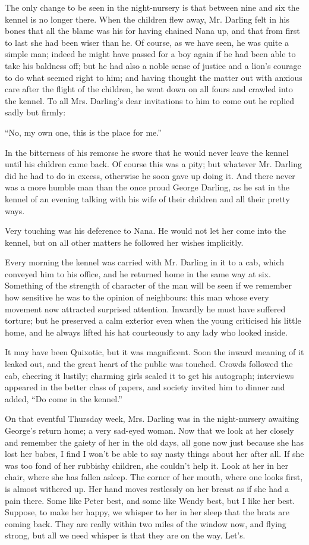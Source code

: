 The only change to be seen in the night-nursery is that between nine
and six the kennel is no longer there. When the children flew away, Mr.
Darling felt in his bones that all the blame was his for having chained
Nana up, and that from first to last she had been wiser than he. Of
course, as we have seen, he was quite a simple man; indeed he might
have passed for a boy again if he had been able to take his baldness
off; but he had also a noble sense of justice and a lion's courage to
do what seemed right to him; and having thought the matter out with
anxious care after the flight of the children, he went down on all
fours and crawled into the kennel. To all Mrs. Darling's dear
invitations to him to come out he replied sadly but firmly:

``No, my own one, this is the place for me.''

In the bitterness of his remorse he swore that he would never leave the
kennel until his children came back. Of course this was a pity; but
whatever Mr. Darling did he had to do in excess, otherwise he soon gave
up doing it. And there never was a more humble man than the once proud
George Darling, as he sat in the kennel of an evening talking with his
wife of their children and all their pretty ways.

Very touching was his deference to Nana. He would not let her come into
the kennel, but on all other matters he followed her wishes implicitly.

Every morning the kennel was carried with Mr. Darling in it to a cab,
which conveyed him to his office, and he returned home in the same way
at six. Something of the strength of character of the man will be seen
if we remember how sensitive he was to the opinion of neighbours: this
man whose every movement now attracted surprised attention. Inwardly he
must have suffered torture; but he preserved a calm exterior even when
the young criticised his little home, and he always lifted his hat
courteously to any lady who looked inside.

It may have been Quixotic, but it was magnificent. Soon the inward
meaning of it leaked out, and the great heart of the public was
touched. Crowds followed the cab, cheering it lustily; charming girls
scaled it to get his autograph; interviews appeared in the better class
of papers, and society invited him to dinner and added, ``Do come in the
kennel.''

On that eventful Thursday week, Mrs. Darling was in the night-nursery
awaiting George's return home; a very sad-eyed woman. Now that we look
at her closely and remember the gaiety of her in the old days, all gone
now just because she has lost her babes, I find I won't be able to say
nasty things about her after all. If she was too fond of her rubbishy
children, she couldn't help it. Look at her in her chair, where she has
fallen asleep. The corner of her mouth, where one looks first, is
almost withered up. Her hand moves restlessly on her breast as if she
had a pain there. Some like Peter best, and some like Wendy best, but I
like her best. Suppose, to make her happy, we whisper to her in her
sleep that the brats are coming back. They are really within two miles
of the window now, and flying strong, but all we need whisper is that
they are on the way. Let's.

